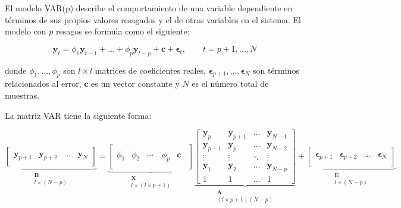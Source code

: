 El modelo VAR(p) describe el comportamiento de una variable dependiente en
términos de sus propios valores resagados y el de otras variables en el
sistema. El modelo con $p$ resagos se formula como el siguiente:

\begin{equation}
\label{eq:var}
 \mathbf{y}_t = \phi_1 \mathbf{y}_{t-1}  + \dots +   \phi_p\mathbf{y}_{t-p}
 + \mathbf{c} + \mathbf{\epsilon}_t, \qquad t=p+1, \dots, N
 \end{equation}

\noindent donde ${\phi_1,\dots,\phi_p}$ son $l \times l$ matrices de
coeficientes reales, $\mathbf{\epsilon}_{p+1},\dots,\mathbf{\epsilon}_N$ son
términos relacionados al error, $\mathbf{c}$ es un vector constante y $N$ es el
número total de muestras.

La matriz VAR tiene la siguiente forma:

\begin{equation}
 \label{eq:varmatrix}
               \underbrace{ \begin{bmatrix}
               \quad \\
               \mathbf{y}_{p+1} &
               \mathbf{y}_{p+2} &
               \dots & 
               \mathbf{y}_N \\
               \quad
               \end{bmatrix}}_{\substack{ \mathbf{B}\\l \times (N-p)}}   
= 
                \underbrace{\left[ 
                \begin{array}{ccccc}
                \quad & \quad & \quad & \quad & \quad \\
                \phi_1  & \phi_2 & \cdots & \phi_p & \mathbf{c} \\  
                \quad &\quad & \quad & \quad & \quad
               \end{array} 
               \right]}_{\substack{ \mathbf{X}\\ l \times (l \times p + 1 )}}
\underbrace{\begin{bmatrix}
   \mathbf{y}_{p}  & \mathbf{y}_{p+1} & \dots    & \mathbf{y}_{N-1}\\
   \mathbf{y}_{p-1}  & \mathbf{y}_{p} & \dots    & \mathbf{y}_{N-2}\\
   \vdots        & \vdots   & \ddots   & \vdots\\
   \mathbf{y}_{1} & \mathbf{y}_{2}   & \dots    & \mathbf{y}_{N-p}\\
   1 & 1   & \dots    & 1 
   \end{bmatrix}}_{\substack{ \mathbf{A}\\ (l\times p +1 )(N-p)}}
+
\underbrace{\begin{bmatrix}
                \quad \\
              \mathbf{\epsilon}_{p+1}  & 
              \mathbf{\epsilon}_{p+2}  & 
              \dots                & 
              \mathbf{\epsilon}_N \\
              \quad
             \end{bmatrix}}_{\substack{\mathbf{E}\\l \times (N-p) }} 
\end{equation}

